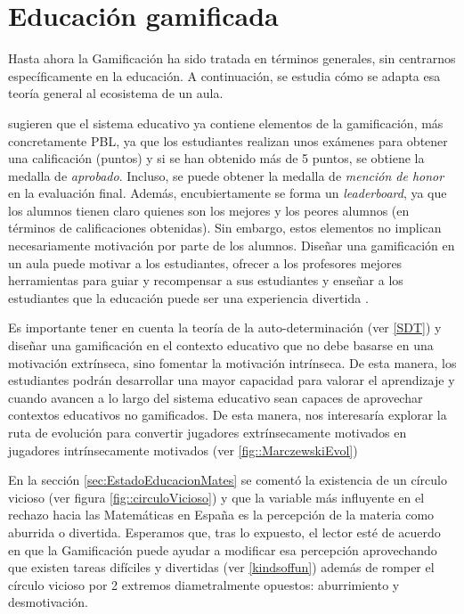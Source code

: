 

\chapter{Educación gamificada}

Hasta ahora la Gamificación ha sido tratada en términos generales, sin centrarnos específicamente en la educación. 
%
A continuación, se estudia cómo se adapta esa teoría general al ecosistema de un aula.




\cite{lee2011gamification} sugieren que el sistema educativo ya contiene elementos de la gamificación, más concretamente \gls{PBL}, ya que los estudiantes realizan unos exámenes para obtener una calificación (puntos) y si se han obtenido más de 5 puntos, se obtiene la medalla de \textit{aprobado}.
%
Incluso, se puede obtener la medalla de \textit{mención de honor} en la evaluación final.
%
Además, encubiertamente se forma un \textit{leaderboard}, ya que los alumnos tienen claro quienes son los mejores y los peores alumnos (en términos de calificaciones obtenidas).
%
Sin embargo, estos elementos no implican necesariamente motivación por parte de los alumnos.
%
Diseñar una gamificación en un aula puede motivar a los estudiantes, ofrecer a los profesores mejores herramientas para guiar y recompensar a sus estudiantes y enseñar a los estudiantes que la educación puede ser una experiencia divertida  \citep{lee2011gamification}.

Es importante tener en cuenta la teoría de la auto-determinación (ver \ref{SDT}) y diseñar una gamificación en el contexto educativo que no debe basarse en una motivación extrínseca, sino fomentar la motivación intrínseca. 
%
De esta manera, los estudiantes podrán desarrollar una mayor capacidad para valorar el aprendizaje y cuando avancen a lo largo del sistema educativo sean capaces de aprovechar contextos educativos no gamificados. 
%
De esta manera, nos interesaría explorar la ruta de evolución \citep{marczewski}  para convertir jugadores extrínsecamente motivados en jugadores intrínsecamente motivados (ver \ref{fig::MarczewskiEvol})


En la sección \ref{sec:EstadoEducacionMates} se comentó la existencia de un círculo vicioso (ver figura \ref{fig::circuloVicioso}) y que la variable más influyente en el rechazo hacia las Matemáticas en España es la percepción de la materia como aburrida o divertida.
%
Esperamos que, tras lo expuesto, el lector esté de acuerdo en que la Gamificación puede ayudar a modificar esa percepción aprovechando que existen tareas difíciles y divertidas (ver \ref{kindsoffun}) además de romper el círculo vicioso por 2 extremos diametralmente opuestos: aburrimiento y desmotivación.

